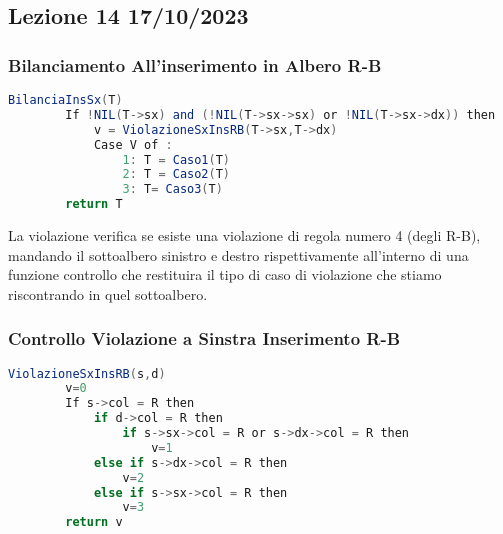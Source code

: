 \subsection{Lezione 14 17/10/2023}

\subsubsection{Bilanciamento All'inserimento in Albero R-B}

\begin{lstlisting}[language=Java]
	BilanciaInsSx(T)
		If !NIL(T->sx) and (!NIL(T->sx->sx) or !NIL(T->sx->dx)) then
			v = ViolazioneSxInsRB(T->sx,T->dx)
			Case V of :
				1: T = Caso1(T)
				2: T = Caso2(T)
				3: T= Caso3(T)
		return T
\end{lstlisting}

La violazione verifica se esiste una violazione di regola numero 4 (degli R-B), mandando il sottoalbero sinistro e destro rispettivamente all'interno di una funzione controllo che restituira il tipo di caso di violazione che stiamo riscontrando in quel sottoalbero.

\subsubsection{Controllo Violazione a Sinstra Inserimento R-B}

\begin{lstlisting}[language=Java]
	ViolazioneSxInsRB(s,d)
		v=0
		If s->col = R then
			if d->col = R then
				if s->sx->col = R or s->dx->col = R then
					v=1
			else if s->dx->col = R then
				v=2
			else if s->sx->col = R then
				v=3
		return v
\end{lstlisting}